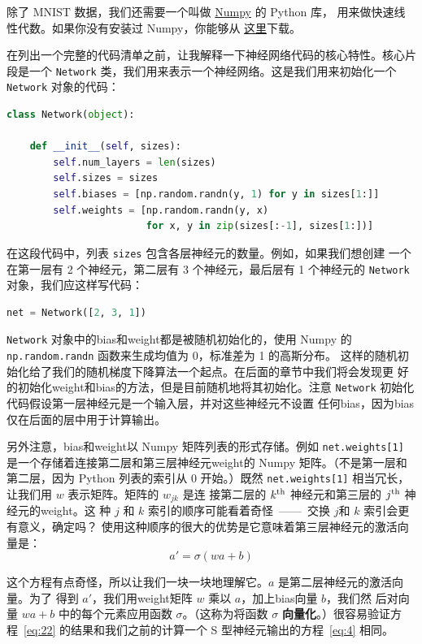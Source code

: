 除了 MNIST 数据，我们还需要一个叫做 \href{http://numpy.org/}{Numpy} 的 Python 库，
用来做快速线性代数。如果你没有安装过 Numpy，你能够从%
\href{http://www.scipy.org/install.html}{这里}下载。

在列出一个完整的代码清单之前，让我解释一下神经网络代码的核心特性。核心片段是一个
\lstinline!Network! 类，我们用来表示一个神经网络。这是我们用来初始化一个
\lstinline!Network! 对象的代码：
\begin{lstlisting}[language=Python]
class Network(object):

	def __init__(self, sizes):
		self.num_layers = len(sizes)
		self.sizes = sizes
		self.biases = [np.random.randn(y, 1) for y in sizes[1:]]
		self.weights = [np.random.randn(y, x)
						for x, y in zip(sizes[:-1], sizes[1:])]
\end{lstlisting}

在这段代码中，列表 \lstinline!sizes! 包含各层神经元的数量。例如，如果我们想创建
一个在第一层有 2 个神经元，第二层有 3 个神经元，最后层有 1 个神经元的
\lstinline!Network! 对象，我们应这样写代码：
\begin{lstlisting}[language=Python]
net = Network([2, 3, 1])
\end{lstlisting}

\lstinline!Network! 对象中的\gls*{bias}和\gls*{weight}都是被随机初始化的，使用
Numpy 的 \lstinline!np.random.randn! 函数来生成均值为 0，标准差为 1 的高斯分布。
这样的随机初始化给了我们的随机梯度下降算法一个起点。在后面的章节中我们将会发现更
好的初始化\gls*{weight}和\gls*{bias}的方法，但是目前随机地将其初始化。注意
\lstinline!Network! 初始化代码假设第一层神经元是一个输入层，并对这些神经元不设置
任何\gls*{bias}，因为\gls*{bias}仅在后面的层中用于计算输出。

另外注意，\gls*{bias}和\gls*{weight}以 Numpy 矩阵列表的形式存储。例如
\lstinline!net.weights[1]! 是一个存储着连接第二层和第三层神经元\gls*{weight}的
Numpy 矩阵。（不是第一层和第二层，因为 Python 列表的索引从 0 开始。）既然
\lstinline!net.weights[1]! 相当冗长，让我们用 $w$ 表示矩阵。矩阵的 $w_{jk}$ 是连
接第二层的 $k^{\rm th}$ 神经元和第三层的 $j^{\rm th}$ 神经元的\gls*{weight}。这
种 $j$ 和 $k$ 索引的顺序可能看着奇怪~——~交换 $j$和 $k$ 索引会更有意义，确定吗？
使用这种顺序的很大的优势是它意味着第三层神经元的激活向量是：
\begin{equation}
  a' = \sigma(w a + b)
  \label{eq:22}\tag{22}
\end{equation}

这个方程有点奇怪，所以让我们一块一块地理解它。$a$ 是第二层神经元的激活向量。为了
得到 $a'$，我们用\gls*{weight}矩阵 $w$ 乘以 $a$，加上\gls*{bias}向量 $b$，我们然
后对向量 $w a +b$ 中的每个元素应用函数 $\sigma$。（这称为将函数 $\sigma$
  \textbf{向量化}。）很容易验证方程~\eqref{eq:22} 的结果和我们之前的计算一个 S
型神经元输出的方程~\eqref{eq:4} 相同。


